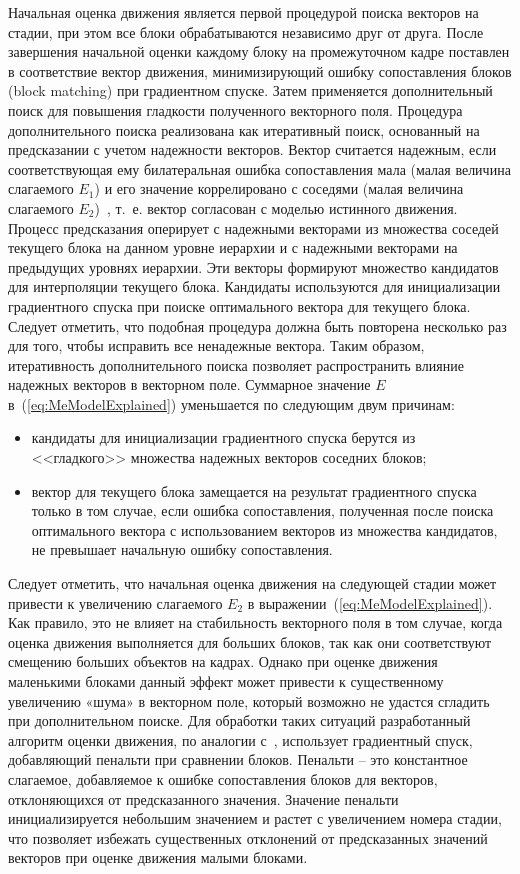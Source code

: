 Начальная оценка движения является первой процедурой поиска векторов на стадии, при этом все блоки обрабатываются независимо друг от друга. После завершения начальной оценки каждому блоку на промежуточном кадре поставлен в соответствие вектор движения, минимизирующий ошибку сопоставления блоков (block matching) при градиентном спуске. Затем применяется дополнительный поиск для повышения гладкости полученного векторного поля. Процедура дополнительного поиска реализована как итеративный поиск, основанный на предсказании с учетом надежности векторов. Вектор считается надежным, если соответствующая ему билатеральная ошибка сопоставления мала (малая величина слагаемого $E_1$) и его значение коррелировано с соседями (малая величина слагаемого $E_2$)~\cite{4480123}, т.~е. вектор согласован с моделью истинного движения. Процесс предсказания оперирует с надежными векторами из множества соседей текущего блока на данном уровне иерархии и с надежными векторами на предыдущих уровнях иерархии. Эти векторы формируют множество кандидатов для интерполяции текущего блока. Кандидаты используются для инициализации градиентного спуска при поиске оптимального вектора для текущего блока. Следует отметить, что подобная процедура должна быть повторена несколько раз для того, чтобы исправить все ненадежные вектора. Таким образом, итеративность дополнительного поиска позволяет распространить влияние надежных векторов в векторном поле.
Суммарное значение $E$ в~(\ref{eq:MeModelExplained}) уменьшается по следующим двум причинам:
\begin{itemize}
\item кандидаты для инициализации градиентного спуска берутся из <<гладкого>> множества надежных векторов соседних блоков;
\item вектор для текущего блока замещается на результат градиентного спуска только в том случае, если ошибка сопоставления, полученная после поиска оптимального вектора с использованием векторов из множества кандидатов, не превышает начальную ошибку сопоставления.
\end{itemize}

Следует отметить, что начальная оценка движения на следующей стадии может привести к увеличению слагаемого $E_2$ в выражении~(\ref{eq:MeModelExplained}). Как правило, это не влияет на стабильность векторного поля в том случае, когда оценка движения выполняется для больших блоков, так как они соответствуют смещению больших объектов на кадрах. Однако при оценке движения маленькими блоками данный эффект может привести к существенному увеличению «шума» в векторном поле, который возможно не удастся сгладить при дополнительном поиске. Для обработки таких ситуаций разработанный алгоритм оценки движения, по аналогии с~\cite{Haan1993}, использует градиентный спуск, добавляющий пенальти при сравнении блоков. Пенальти – это константное слагаемое, добавляемое к ошибке сопоставления блоков для векторов, отклоняющихся от предсказанного значения. Значение пенальти инициализируется небольшим значением и растет с увеличением номера стадии, что позволяет избежать существенных отклонений от предсказанных значений векторов при оценке движения малыми блоками.

